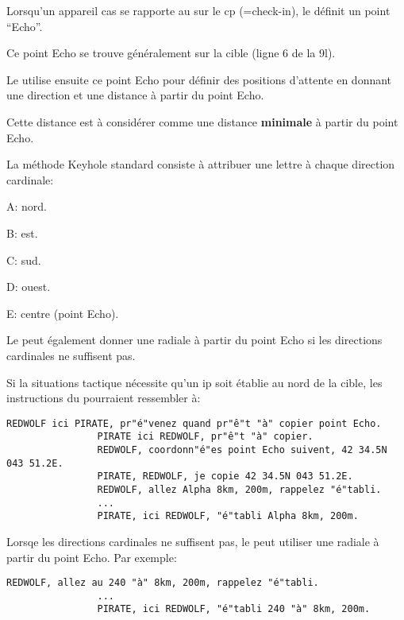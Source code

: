 \begin{e1}
\begin{e2}
\begin{e3}
			Lorsqu'un appareil \gls{cas} se rapporte au \ja{} sur le \gls{cp} (=check-in), le \ja{} définit un point ``Echo''.
			
			Ce point Echo se trouve généralement sur la cible (ligne 6 de la \gls{9l}).
			
			Le \ja{} utilise ensuite ce point Echo pour définir des positions d'attente en donnant une direction et une distance à partir du point Echo.
			
			Cette distance est à considérer comme une distance \textbf{minimale} à partir du point Echo.
			
			La méthode Keyhole standard consiste à attribuer une lettre à chaque direction cardinale:
			\begin{e4}
				\item A: nord.
				\item B: est.
				\item C: sud.
				\item D: ouest.
				\item E: centre (point Echo).
			\end{e4}
			
			Le \ja{} peut également donner une radiale à partir du point Echo si les directions cardinales ne suffisent pas.
			
			
			\begin{e4}
				\item Si la situations tactique nécessite qu'un \gls{ip} soit établie au nord de la cible, les instructions du \ja{} pourraient ressembler à:
				
				\begin{lstlisting}[caption=Keyhole: directions cardinale, label=keyholecard]
				REDWOLF ici PIRATE, pr"é"venez quand pr"ê"t "à" copier point Echo.
				PIRATE ici REDWOLF, pr"ê"t "à" copier.
				REDWOLF, coordonn"é"es point Echo suivent, 42 34.5N 043 51.2E.
				PIRATE, REDWOLF, je copie 42 34.5N 043 51.2E.
				REDWOLF, allez Alpha 8km, 200m, rappelez "é"tabli.
				...
				PIRATE, ici REDWOLF, "é"tabli Alpha 8km, 200m.
				\end{lstlisting}
				
				\item Lorsqe les directions cardinales ne suffisent pas, le \ja{} peut utiliser une radiale à partir du point Echo. Par exemple:
				
				\begin{lstlisting}[caption=Keyhole: radiale, label=keyholerad]
				REDWOLF, allez au 240 "à" 8km, 200m, rappelez "é"tabli.
				...
				PIRATE, ici REDWOLF, "é"tabli 240 "à" 8km, 200m.
				\end{lstlisting}
				

\end{e4}
\end{e3}
\end{e2}
\end{e1}
